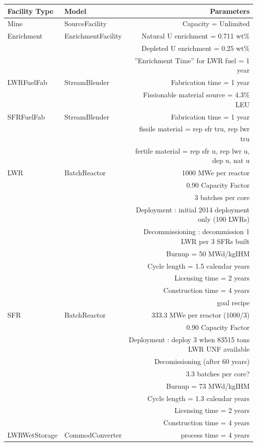 \onecolumn
\begin{table}
\centering
\begin{tabular}{|l|l|r|}
\hline
\textbf{Facility Type} &\textbf{Model} & \textbf{Parameters}\\
\hline
Mine & SourceFacility & Capacity = Unlimited\\
Enrichment & EnrichmentFacility & Natural U enrichment = 0.711 wt\% \\
& & Depleted U enrichment =  0.25 wt\% \\
& & ''Enrichment Time'' for LWR fuel = 1 year\\
LWRFuelFab & StreamBlender & Fabrication time = 1 year\\
& & Fissionable material source = 4.3\% LEU\\
SFRFuelFab & StreamBlender  & Fabrication time = 1 year\\
& & fissile material = rep sfr tru, rep lwr tru \\
& & fertile material = rep sfr u, rep lwr u, dep u, nat u \\
LWR & BatchReactor & 1000 MWe per reactor \\
& & 0.90 Capacity Factor \\
& & 3 batches per core \\ 
& & Deployment : initial 2014 deployment only (100 LWRs) \\
& & Decommissioning : decommission 1 LWR per 3 SFRs built \\
& & Burnup = 50 MWd/kgIHM \\
& & Cycle length = 1.5 calendar years \\
& & Licensing time = 2 years \\
& & Construction time = 4 years \\
& & goal recipe \\
SFR & BatchReactor & 333.3 MWe per reactor (1000/3) \\
& & 0.90 Capacity Factor \\
& & Deployment : deploy 3 when 83515 tons LWR UNF available \\ 
& & Decomissioning (after 60 years) \\
& & 3.3 batches per core? \\ 
& & Burnup = 73 MWd/kgIHM \\
& & Cycle length = 1.3 calendar years \\
& & Licensing time = 2 years \\
& & Construction time = 4 years \\
LWRWetStorage & CommodConverter & process time = 4 years\\

\end{tabular}
\end{table}
